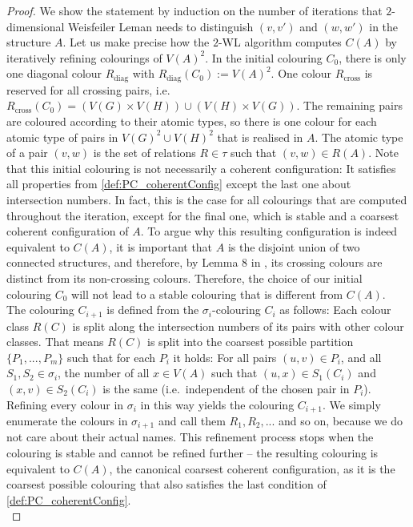 \documentclass[10pt,a4paper]{article}
\newcommand{\diag}{{\operatorname{diag}}}
\begin{document}
		\begin{proof}
			We show the statement by induction on the number of iterations that $2$-dimensional Weisfeiler Leman needs to distinguish $(v,v')$ and $(w,w')$ in the structure $A$. Let us make precise how the $2$-WL algorithm computes $C(A)$ by iteratively refining colourings of $V(A)^2$. In the initial colouring $C_0$, there is only one diagonal colour $R_{\diag}$ with $R_{\diag}(C_0) := V(A)^2$. One colour $R_{\text{cross}}$ is reserved for all crossing pairs, i.e.\ $R_{\text{cross}}(C_0) = (V(G) \times V(H)) \cup (V(H) \times V(G)) $. The remaining pairs are coloured according to their atomic types, so there is one colour for each atomic type of pairs in $V(G)^2 \cup V(H)^2$ that is realised in $A$. The atomic type of a pair $(v,w)$ is the set of relations $R \in \tau$ such that $(v,w) \in R(A)$.
			Note that this initial colouring is not necessarily a coherent configuration: It satisfies all properties from \autoref{def:PC_coherentConfig} except the last one about intersection numbers. In fact, this is the case for all colourings that are computed throughout the iteration, except for the final one, which is stable and a coarsest coherent configuration of $A$. To argue why this resulting configuration is indeed equivalent to $C(A)$, it is important that $A$ is the disjoint union of two connected structures, and therefore, by Lemma 8 in \cite{dwl}, its crossing colours are distinct from its non-crossing colours. Therefore, the choice of our initial colouring $C_0$ will not lead to a stable colouring that is different from $C(A)$.\\
			
			The colouring $C_{i+1}$ is defined from the $\sigma_i$-colouring $C_i$ as follows: Each colour class $R(C)$ is split along the intersection numbers of its pairs with other colour classes. That means $R(C)$ is split into the coarsest possible partition $\{ P_1,...,P_m \}$ such that for each $P_i$ it holds: For all pairs $(u,v) \in P_i$, and all $S_1, S_2 \in \sigma_i$, the number of all $x \in V(A)$ such that $(u,x) \in S_1(C_i)$ and $(x,v) \in S_2(C_i)$ is the same (i.e.\ independent of the chosen pair in $P_i$).\\
			Refining every colour in $\sigma_i$ in this way yields the colouring $C_{i+1}$. We simply enumerate the colours in $\sigma_{i+1}$ and call them $R_1,R_2,...$ and so on, because we do not care about their actual names. This refinement process stops when the colouring is stable and cannot be refined further -- the resulting colouring is equivalent to $C(A)$, the canonical coarsest coherent configuration, as it is the coarsest possible colouring that also satisfies the last condition of \autoref{def:PC_coherentConfig}.\\
			

\end{proof}
\end{document}
